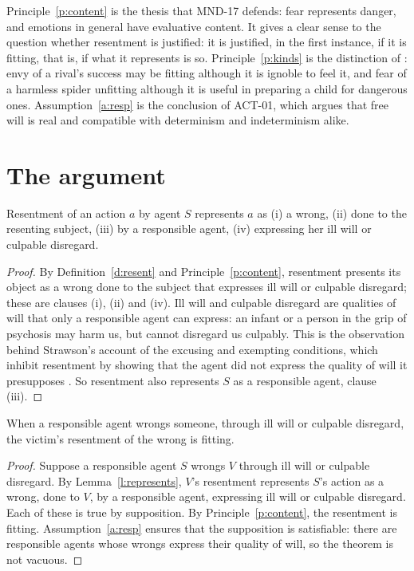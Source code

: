 \documentclass{situationist-preprint}
\begin{document}
Principle~\ref{p:content} is the thesis that MND-17 defends: fear represents danger, and emotions in general have evaluative content. It gives a clear sense to the question whether resentment is justified: it is justified, in the first instance, if it is fitting, that is, if what it represents is so. Principle~\ref{p:kinds} is the distinction of \citet{DArmsJacobson2000}: envy of a rival's success may be fitting although it is ignoble to feel it, and fear of a harmless spider unfitting although it is useful in preparing a child for dangerous ones. Assumption~\ref{a:resp} is the conclusion of ACT-01, which argues that free will is real and compatible with determinism and indeterminism alike.

\section{The argument}

\begin{lemma}\label{l:represents}
Resentment of an action $a$ by agent $S$ represents $a$ as (i) a wrong, (ii) done to the resenting subject, (iii) by a responsible agent, (iv) expressing her ill will or culpable disregard.
\end{lemma}

\begin{proof}
By Definition~\ref{d:resent} and Principle~\ref{p:content}, resentment presents its object as a wrong done to the subject that expresses ill will or culpable disregard; these are clauses (i), (ii) and (iv). Ill will and culpable disregard are qualities of will that only a responsible agent can express: an infant or a person in the grip of psychosis may harm us, but cannot disregard us culpably. This is the observation behind Strawson's account of the excusing and exempting conditions, which inhibit resentment by showing that the agent did not express the quality of will it presupposes \citep{Strawson1962}. So resentment also represents $S$ as a responsible agent, clause (iii).
\end{proof}

\begin{theorem}\label{t:main}
When a responsible agent wrongs someone, through ill will or culpable disregard, the victim's resentment of the wrong is fitting.
\end{theorem}

\begin{proof}
Suppose a responsible agent $S$ wrongs $V$ through ill will or culpable disregard. By Lemma~\ref{l:represents}, $V$'s resentment represents $S$'s action as a wrong, done to $V$, by a responsible agent, expressing ill will or culpable disregard. Each of these is true by supposition. By Principle~\ref{p:content}, the resentment is fitting. Assumption~\ref{a:resp} ensures that the supposition is satisfiable: there are responsible agents whose wrongs express their quality of will, so the theorem is not vacuous.
\end{proof}
\end{document}
